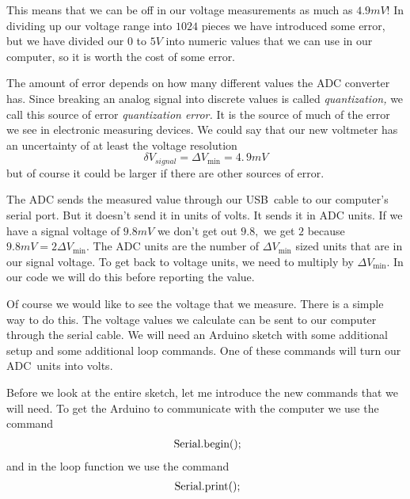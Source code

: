 This means that we can be off in our voltage measurements as much as $4.9%
\unit{mV}$! In dividing up our voltage range into $1024$ pieces we have
introduced some error, but we have divided our $0$ to $5\unit{V}$ into
numeric values that we can use in our computer, so it is worth the cost of
some error.

The amount of error depends on how many different values the ADC converter
has. Since breaking an analog signal into discrete values is called \emph{%
quantization, }we call this source of error \emph{quantization error.} It is
the source of much of the error we see in electronic measuring devices. We
could say that our new voltmeter has an uncertainty of at least the voltage
resolution%
\begin{equation*}
\delta V_{signal}=\Delta V_{\min }=4.\,\allowbreak 9\unit{mV}
\end{equation*}%
but of course it could be larger if there are other sources of error.

The ADC sends the measured value through our USB\ cable to our computer's
serial port. But it doesn't send it in units of volts. It sends it in ADC
units. If we have a signal voltage of $9.8\unit{mV}$ we don't get out $9.8,$
we get $2$ because $9.8\unit{mV}=2\Delta V_{\min }.$ The ADC units are the
number of $\Delta V_{\min }$ sized units that are in our signal voltage. To
get back to voltage units, we need to multiply by $\Delta V_{\min }.$ In our
code we will do this before reporting the value.

Of course we would like to see the voltage that we measure. There is a
simple way to do this. The voltage values we calculate can be sent to our
computer through the serial cable. We will need an Arduino sketch with some
additional setup and some additional loop commands. One of these commands
will turn our ADC\ units into volts.

Before we look at the entire sketch, let me introduce the new commands that
we will need. To get the Arduino to communicate with the computer we use the
command 
\begin{equation*}
\begin{tabular}{l}
\ Serial.begin();%
\end{tabular}%
\end{equation*}%
and in the loop function we use the command\ 
\begin{equation*}
\begin{tabular}{l}
\ Serial.print();%
\end{tabular}%
\end{equation*}

